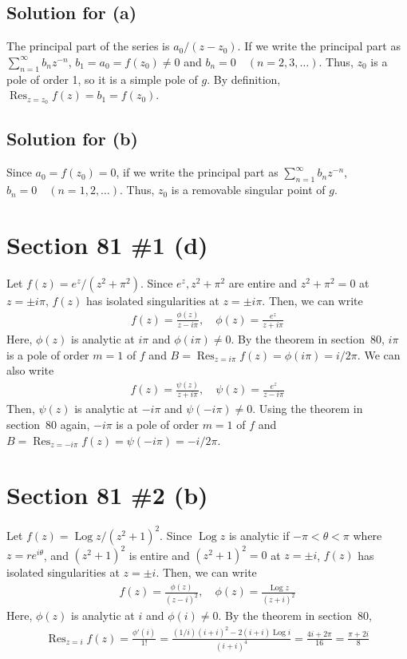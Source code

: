 \documentclass{scrartcl}
\newcommand{\Log}{\operatorname{Log}}
\DeclareMathOperator*{\Res}{Res}
\begin{document}
\subsection{Solution for (a)}
The principal part of the series is \(a_0 / (z - z_0)\).
If we write the principal part as \(\sum^\infty_{n = 1} b_n z^{-n}\), \(b_1 = a_0 = f(z_0) \not = 0\) and \(b_n = 0 \quad (n = 2, 3, \dots)\).
Thus, \(z_0\) is a pole of order 1, so it is a simple pole of \(g\).
By definition, \(\Res_{z = z_0} f(z) = b_1 = f(z_0)\).

\subsection{Solution for (b)}
Since \(a_0 = f(z_0) = 0\), if we write the principal part as \(\sum^\infty_{n = 1} b_n z^{-n}\), \(b_n = 0 \quad (n = 1, 2, \dots)\).
Thus, \(z_0\) is a removable singular point of \(g\).

\section{Section 81 \#1 (d)}
Let \(f(z) = e^z / (z^2 + \pi^2)\).
Since \(e^z, z^2 + \pi^2\) are entire and \(z^2 + \pi^2 = 0\) at \(z = \pm i\pi\), \(f(z)\) has isolated singularities at \(z = \pm i\pi\).
Then, we can write
\begin{align*}
  f(z) = \frac{\phi(z)}{z - i\pi}, \quad \phi(z) = \frac{e^z}{z + i\pi}
\end{align*}
Here, \(\phi(z)\) is analytic at \(i\pi\) and \(\phi(i\pi) \not = 0\).
By the theorem in section~80, \(i\pi\) is a pole of order \(m = 1\) of \(f\) and \(B = \Res_{z = i\pi} f(z) = \phi(i\pi) = i / 2\pi\).
We can also write
\begin{align*}
  f(z) = \frac{\psi(z)}{z + i\pi}, \quad \psi(z) = \frac{e^z}{z - i\pi}
\end{align*}
Then, \(\psi(z)\) is analytic at \(-i\pi\) and \(\psi(-i\pi) \not = 0\).
Using the theorem in section~80 again, \(-i\pi\) is a pole of order \(m = 1\) of \(f\) and \(B = \Res_{z = -i\pi} f(z) = \psi(-i\pi) = -i / 2\pi\).

\section{Section 81 \#2 (b)}
Let \(f(z) = \Log z / (z^2 + 1)^2\).
Since \(\Log z\) is analytic if \(-\pi < \theta < \pi\) where \(z = re^{i\theta}\), and \((z^2 + 1)^2\) is entire and \((z^2 + 1)^2 = 0\) at \(z = \pm i\), \(f(z)\) has isolated singularities at \(z = \pm i\).
Then, we can write
\begin{align*}
  f(z) = \frac{\phi(z)}{(z - i)^2}, \quad \phi(z) = \frac{\Log z}{(z + i)^2}
\end{align*}
Here, \(\phi(z)\) is analytic at \(i\) and \(\phi(i) \not = 0\).
By the theorem in section~80,
\begin{align*}
  \Res_{z = i} f(z) = \frac{\phi'(i)}{1!} = \frac{(1 / i)(i + i)^2 - 2(i + i)\Log i}{(i + i)^4} = \frac{4i + 2\pi}{16} = \frac{\pi + 2i}{8}
\end{align*}
\end{document}
